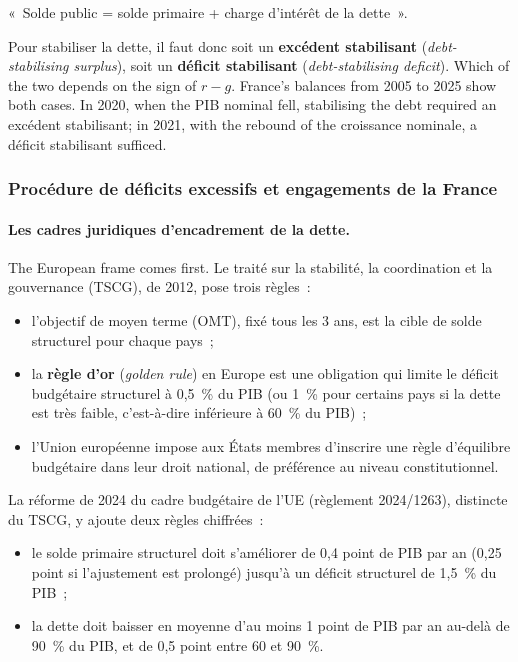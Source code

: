 \begin{remark}
  «~Solde public = solde primaire + charge d'intérêt de la dette~».
\end{remark}

Pour stabiliser la dette, il faut donc soit un \textbf{excédent stabilisant}
(\textit{debt-stabilising surplus}), soit un \textbf{déficit stabilisant}
(\textit{debt-stabilising deficit}). Which of the two depends on the sign of
$r - g$. France's balances from 2005 to 2025 show both cases. In 2020, when the
PIB nominal fell, stabilising the debt required an excédent stabilisant; in
2021, with the rebound of the croissance nominale, a déficit stabilisant
sufficed.

\subsubsection{Procédure de déficits excessifs et engagements de la France}

\paragraph{Les cadres juridiques d'encadrement de la dette.}
The European frame comes first. Le traité sur la stabilité, la coordination et
la gouvernance (TSCG), de 2012, pose trois règles~:
\begin{itemize}
  \item l'objectif de moyen terme (OMT), fixé tous les 3 ans, est la cible de
    solde structurel pour chaque pays~;
  \item la \textbf{règle d'or} (\textit{golden rule}) en Europe est une
    obligation qui limite le déficit budgétaire structurel à 0,5~\% du PIB (ou
    1~\% pour certains pays si la dette est très faible, c'est-à-dire
    inférieure à 60~\% du PIB)~;
  \item l'Union européenne impose aux États membres d'inscrire une règle
    d'équilibre budgétaire dans leur droit national, de préférence au niveau
    constitutionnel.
\end{itemize}
La réforme de 2024 du cadre budgétaire de l'UE (règlement 2024/1263), distincte
du TSCG, y ajoute deux règles chiffrées~:
\begin{itemize}
  \item le solde primaire structurel doit s'améliorer de 0,4 point de PIB par an
    (0,25 point si l'ajustement est prolongé) jusqu'à un déficit structurel de
    1,5~\% du PIB~;
  \item la dette doit baisser en moyenne d'au moins 1 point de PIB par an
    au-delà de 90~\% du PIB, et de 0,5 point entre 60 et 90~\%.
\end{itemize}

